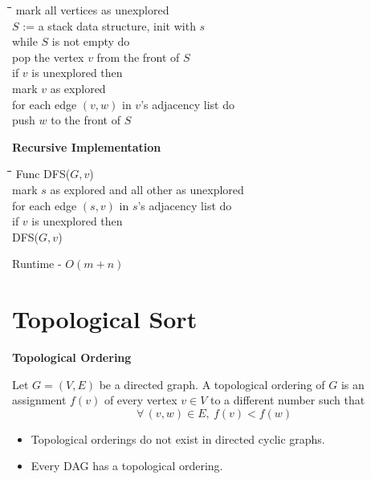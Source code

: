 \documentclass{article}
\begin{document}
	\begin{tabbing}
		\qquad \= \qquad \= \qquad \= \qquad \= \kill
		mark all vertices as unexplored \\
		$S$ := a stack data structure, init with $s$ \\
		while $S$ is not empty do \\
		\> pop the vertex $v$ from the front of $S$ \\
		\> if $v$ is unexplored then \\
		\> \> mark $v$ as explored \\
		\> \> for each edge $(v,w)$ in $v$'s adjacency list do \\
		\> \> \> push $w$ to the front of $S$
	\end{tabbing}
	\pagebreak
	
	\begin{center}
		\begin{large}
			\textbf{Recursive Implementation}
		\end{large}
	\end{center}
	
	\begin{tabbing}
		\qquad \= \qquad \= \qquad \= \qquad \= \kill
		Func DFS($G,v$) \\
		\> mark $s$ as explored and all other as unexplored \\
		\> for each edge $(s,v)$ in $s$'s adjacency list do \\
		\> \> if $v$ is unexplored then\\
		\> \>  \> DFS($G,v$)
	\end{tabbing} Runtime - $O(m + n)$
	\section{Topological Sort}
	
	\begin{center}
		\begin{large}
			\textbf{Topological Ordering}
		\end{large}
	\end{center}
	\vspace{0.1mm}
	Let $G = (V,E)$ be a directed graph. A topological ordering of $G$ is an assignment $f(v)$ of every vertex $v \in V$ to a different number such that \[\forall \, (v,w) \in E, \: f(v) < f(w)\]
	
	\begin{itemize}
		\item Topological orderings do not exist in directed cyclic graphs.
		\item Every DAG has a topological ordering.
	\end{itemize}	
	
\end{document}
